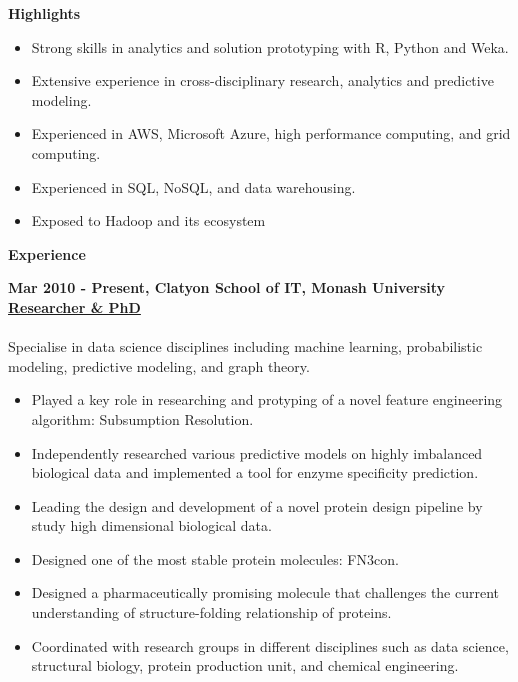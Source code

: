 \documentclass[a4paper,8pt,final]{memoir}
\newcommand{\Sep}{\vspace{1.5em}}
\newcommand{\SmallSep}{\vspace{0.5em}}
\newcommand{\CVSection}[1]
	{\Large\textbf{#1}\par
	\SmallSep\normalsize\normalfont}
\newcommand{\CVItem}[1]
	{\textbf{\color{RoyalBlue} #1}}
\begin{document}

\CVSection{Highlights}
    \begin{itemize}
        \item Strong skills in analytics and solution prototyping with R, Python and Weka.
        \item Extensive experience in cross-disciplinary research, analytics and predictive modeling.
        \item Experienced in AWS, Microsoft Azure, high performance computing, and grid computing.
        \item Experienced in SQL, NoSQL, and data warehousing.
        \item Exposed to Hadoop and its ecosystem
    \end{itemize}
\Sep

\CVSection{Experience}
\CVItem{Mar 2010 - Present, Clatyon School of IT, Monash University}\\
\underline{\textbf{Researcher \& PhD}}\\
\\
Specialise in data science disciplines including machine learning, probabilistic modeling, predictive modeling, and graph theory.
    \begin{itemize}
        \item Played a key role in researching and protyping of a novel feature engineering algorithm: Subsumption Resolution.
        \item Independently researched various predictive models on highly imbalanced biological data and implemented a tool for enzyme specificity prediction.
        \item Leading the design and development of a novel protein design pipeline by study high dimensional biological data.
        \item Designed one of the most stable protein molecules: FN3con.
        \item Designed a pharmaceutically promising molecule that challenges the current understanding of structure-folding relationship of proteins.
        \item Coordinated with research groups in different disciplines such as data science, structural biology, protein production unit, and chemical engineering.
    \end{itemize}
\Sep
\end{document}
